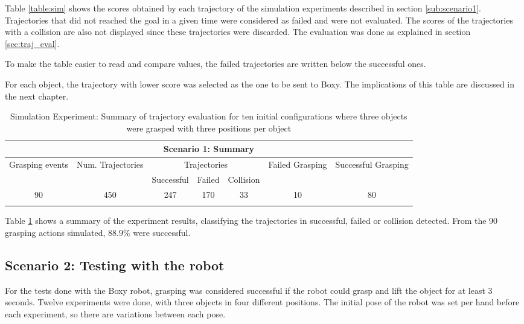 Table \ref{table:sim} shows the scores obtained by each trajectory of the simulation experiments described in section \ref{sub:scenario1}.   Trajectories that did not reached the goal in a given time were considered as failed and were not evaluated. The scores of the trajectories with a collision are also not displayed since these trajectories were discarded. The evaluation was done as explained in section \ref{sec:traj_eval}.

To make the table easier to read and compare values, the failed trajectories are written below the successful ones.

 \vspace{-60pt}

For each object, the trajectory with lower score was selected as the one to be sent to Boxy. The implications of this table are discussed in the next chapter.

{\small
\begin{center}
\begin{longtable}[c]{ | c | c | c | c | c | c || c || }
\hline
\hline
\multicolumn{7}{|c|}{Scenario 1: Summary} \\
\hline
\hline
\multirow{2}{1.7cm}{Grasping events} & \multirow{2}{1.7cm}{Num. Trajectories} & \multicolumn{3}{c|}{Trajectories} & \multirow{2}{1.5cm}{Failed Grasping} & \multirow{2}{1.5cm}{Successful Grasping} \\
& & Successful & Failed & Collision & &\\
\hline
90 & 450 & 247 & 170 & 33 & 10 & 80 \\ 
\hline
\caption{Simulation Experiment: Summary of trajectory evaluation for ten initial configurations where three objects were grasped with three positions per object}
\label{table:summary}
\end{longtable}
\end{center}} \vspace{-50pt}

Table \ref{table:summary} shows a summary of the experiment results, classifying the trajectories in successful, failed or collision detected. From the 90 grasping actions simulated, $88.9\%$ were successful.

\subsection{Scenario 2: Testing with the robot}

For the tests done with the Boxy robot, grasping was considered successful if the robot could grasp and lift the object for at least 3 seconds. Twelve experiments were done, with three objects in four different positions. The initial pose of the robot was set per hand before each experiment, so there are variations between each pose. 